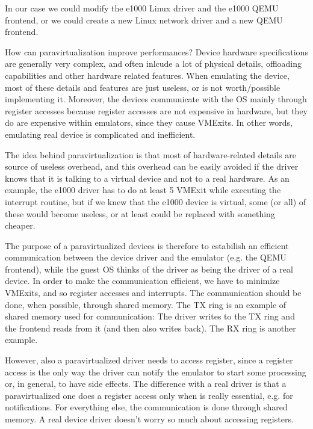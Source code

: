 In our case we could modify the e1000 Linux driver and the e1000 QEMU frontend, or we could create a new Linux network driver and
a new QEMU frontend.

\vspace{0.5cm}

How can paravirtualization improve performances? Device hardware specifications are generally very complex, and often
inlcude a lot of physical details, offloading capabilities and other hardware related features. When emulating the device, most of these 
details and features are just useless, or is not worth/possible implementing it. Moreover, the devices communicate with the OS mainly 
through register accesses because register accesses are not expensive in hardware, but they do are expensive within emulators, since
they cause VMExits. In other words, emulating real device is complicated and inefficient.

\vspace{0.5cm}

The idea behind paravirtualization is that most of hardware-related details are source of useless overhead, and this overhead can be 
easily avoided if the driver knows that it is talking to a virtual device and not to a real hardware. As an example, the e1000 driver has
to do at least 5 VMExit while executing the interrupt routine, but if we knew that the e1000 device is virtual, some (or all) of these
would become useless, or at least could be replaced with something cheaper.

The purpose of a paravirtualized devices is therefore to estabilish an efficient communication between the device driver and the emulator
(e.g. the QEMU frontend), while the guest OS thinks of the driver as being the driver of a real device.
In order to make the communication efficient, we have to minimize VMExits, and so register accesses and interrupts. The communication
should be done, when
possible, through shared memory. The TX ring is an example of shared memory used for communication: The driver writes to the TX ring and
the frontend reads from it (and then also writes back). The RX ring is another example.

\vspace{0.5cm}

However, also a paravirtualized driver needs to access register, since a register access is the only way the driver can notify the
emulator to start some processing or, in general, to have side effects. The difference with a real driver is that a paravirtualized one
does a register access only when is really essential, e.g. for notifications. For everything else, the communication is done through
shared memory. A real device driver doesn't worry so much about accessing registers.

